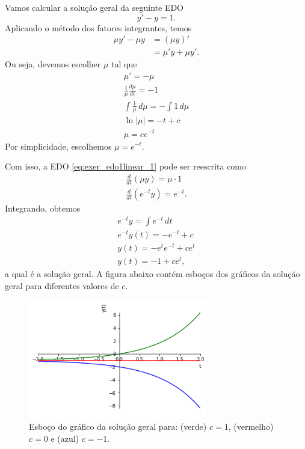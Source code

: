 \begin{ex}
  Vamos calcular a solução geral da seguinte EDO
  \begin{equation}\label{eq:exer_edo1linear_1}
    y' - y = 1. 
  \end{equation}
  Aplicando o método dos fatores integrantes, temos
  \begin{align}
    \mu y' - \mu y &= (\mu y)' \\
                   &= \mu' y + \mu y'.
  \end{align}
  Ou seja, devemos escolher $\mu$ tal que
  \begin{gather}
    \mu' = -\mu \\
    \frac{1}{\mu}\frac{d\mu}{dt} = -1 \\
    \int \frac{1}{\mu}\,d\mu = -\int 1\,d\mu \\
    \ln|\mu| = -t + c \\
    \mu = ce^{-t}
  \end{gather}
  Por simplicidade, escolhemos $\mu = e^{-t}$.

  Com isso, a EDO \eqref{eq:exer_edo1linear_1} pode ser reescrita como
  \begin{gather}
    \frac{d}{dt}\left(\mu y\right) = \mu\cdot 1 \\
    \frac{d}{dt}\left(e^{-t}y\right) = e^{-t}.
  \end{gather}
  Integrando, obtemos
  \begin{gather}
    e^{-t}y = \int e^{-t}\,dt \\
    e^{-t}y(t) = -e^{-t} + c \\
    y(t) = -e^te^{-t} + ce^{t} \\
    y(t) =  -1 + ce^{t},
  \end{gather}
  a qual é a solução geral. A figura abaixo contém esboços dos gráficos da solução geral para diferentes valores de $c$.

  \begin{figure}[H]
    \centering
    \includegraphics[width=0.7\textwidth]{cap_edo1ordem/dados/fig_ex_edo1o_fi/fig_ex_edo1o_fi}
    \caption[Esboço do gráfico da solução geral para diferentes valores de $c$.]{Esboço do gráfico da solução geral para: (verde) $c=1$, (vermelho) $c=0$ e (azul) $c=-1$.}
    \label{fig:ex_edo1o_fi}
  \end{figure}


\end{ex}
